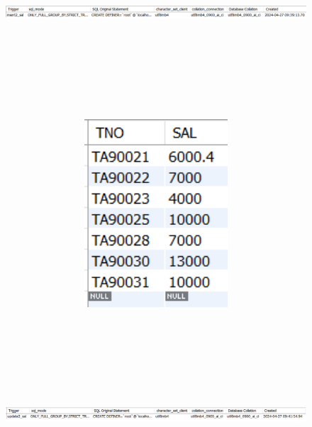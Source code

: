 \documentclass{ctexart}
\begin{document}
\begin{figure}[H]
	\centering 
	\includegraphics[height=7cm,width=14cm]{55.png}
	\end{figure}
	\begin{figure}[H]
		\centering 
		\includegraphics[height=7cm,width=14cm]{56.png}
		\end{figure}
		\begin{figure}[H]
			\centering 
			\includegraphics[height=7cm,width=14cm]{62.png}
			\end{figure}
\end{document}
